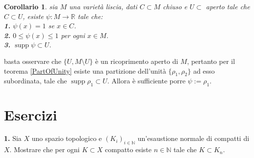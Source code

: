 \documentclass[oneside, 11pt]{amsbook}
\makeatletter
\newcommand{\R}{\mathbb{R}}
\newcommand{\gr}[1]{\textbf{#1}}
\newcommand{\N}{{\mathbb N}}
\newcommand{\0}{{(0)}}
\newcommand{\3}{{(3)}}
\theoremstyle{colonplain}
\newtheorem{cor}[thm]{Corollario}
\theoremstyle{colondefinition}
\theoremstyle{colonremark}
\numberwithin{equation}{chapter}
\renewcommand{\proofname}{Dimostrazione}
\renewenvironment{proof}[1][\proofname]{\par
  \pushQED{\qed}%
  \normalfont \topsep6\p@\@plus6\p@\relax
  \trivlist
  \item[\hskip\labelsep\bfseries #1:]\ignorespaces
}{%
  \popQED\endtrivlist\@endpefalse
}
\makeatother
\begin{document}
\begin{cor}
    sia $M$ una varietà liscia, dati $C \subset M$ chiuso e $U \subset$ aperto tale che $C \subset U$, esiste $\psi : M \longrightarrow \R$ tale che: \\
    \gr{1.} $\psi(x) = 1$ se $x \in C$. \\
    \gr{2.} $0 \leq \psi(x) \leq 1$ per ogni $x \in M$. \\
    \gr{3.} $\operatorname{supp} \psi \subset U$.
\end{cor}
\begin{proof}
    basta osservare che $\{U, M \setminus U\}$ è un ricoprimento aperto di $M$, pertanto per il teorema \ref{PartOfUnity} esiste una partizione dell'unità $\{\rho_1, \rho_2\}$ ad esso subordinata, tale che $\operatorname{supp} \rho_1 \subset U$. Allora è sufficiente porre $\psi := \rho_1$.
\end{proof}

\section{Esercizi}
\gr{1.} Sia $X$ uno spazio topologico e $(K_i)_{i \in \N}$ un'esaustione normale di compatti di $X$. Mostrare che per ogni $K \subset X$ compatto esiste $n \in \N$ tale che $K \subset K_n$.
\end{document}
